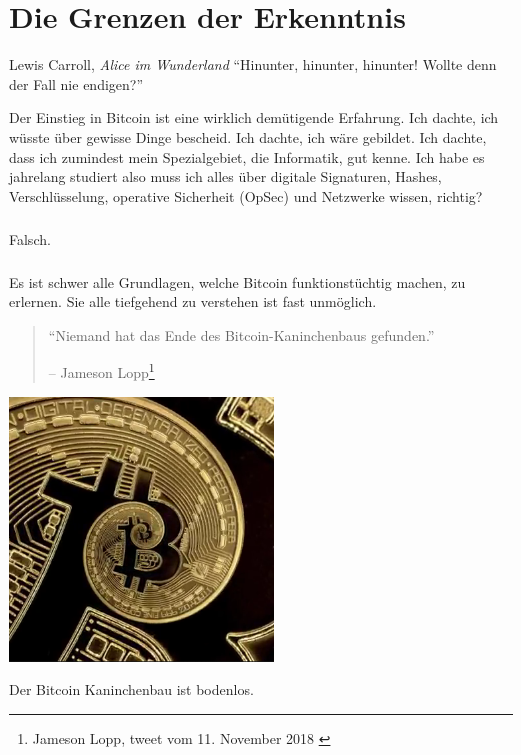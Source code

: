\chapter{Die Grenzen der Erkenntnis}
\label{les:7}

\begin{chapquote}{Lewis Carroll, \textit{Alice im Wunderland}}
\enquote{Hinunter, hinunter, hinunter! Wollte denn der Fall nie endigen?}
\end{chapquote}

Der Einstieg in Bitcoin ist eine wirklich demütigende Erfahrung. Ich dachte, ich
wüsste über gewisse Dinge bescheid. Ich dachte, ich wäre gebildet. Ich dachte,
dass ich zumindest mein Spezialgebiet, die Informatik, gut kenne. Ich habe es
jahrelang studiert also muss ich alles über digitale Signaturen, Hashes,
Verschlüsselung, operative Sicherheit (OpSec) und Netzwerke wissen, richtig?

\paragraph{}
Falsch.

\paragraph{}
Es ist schwer alle Grundlagen, welche Bitcoin funktionstüchtig machen, zu
erlernen. Sie alle tiefgehend zu verstehen ist fast unmöglich.

\begin{quotation}\begin{samepage}
\enquote{Niemand hat das Ende des Bitcoin-Kaninchenbaus gefunden.}
\begin{flushright} -- Jameson Lopp\footnote{Jameson Lopp, tweet vom 11. November 2018 \cite{lopp-tweet}}
\end{flushright}\end{samepage}\end{quotation}

\begin{center}
  \centering
  \includegraphics[width=7cm]{assets/images/rabbit-hole-bottomless.png}
  \caption{Der Bitcoin Kaninchenbau ist bodenlos.}
  \label{fig:rabbit-hole-bottomless}
\end{center}

